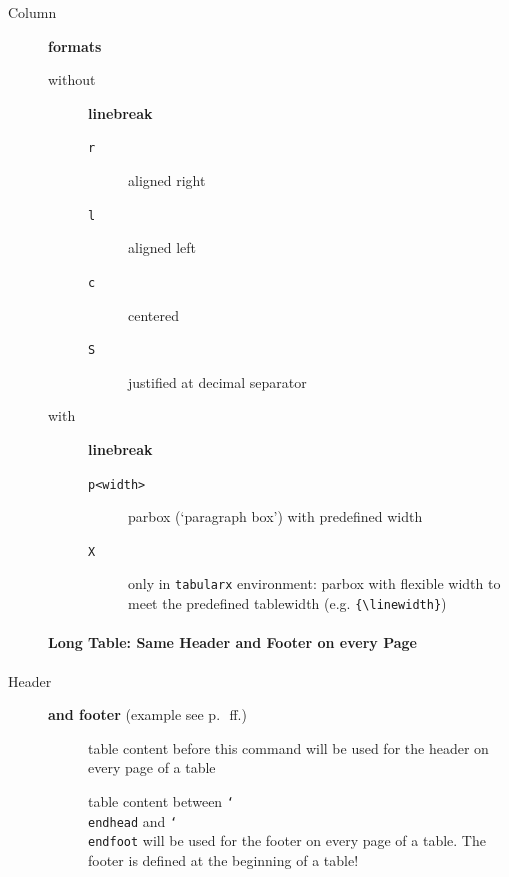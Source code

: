 \documentclass{pharmrep}
\makeatletter
\DeclareRobustCommand\meta[1]{%
   \ensuremath\langle
   \ifmmode \expandafter \nfss@text \fi
   {%
      \meta@font@select
      \edef\meta@hyphen@restore
      {\hyphenchar\the\font\the\hyphenchar\font}%
      \hyphenchar\font\m@ne
      \language\l@nohyphenation
      #1\/%
      \meta@hyphen@restore
   }\ensuremath\rangle
}
\DeclareRobustCommand\cs[1]{\texttt{\char`\\#1}}
\providecommand\oarg[1]{%
   {\ttfamily[}\meta{#1}{\ttfamily]}}
\def\meta@font@select{\itshape}
\makeatother
\begin{document}
\begin{description}
   \item[Column] \textbf{formats}
   \begin{description}
      \item[without] \textbf{linebreak}
      \begin{description}
         \item[\texttt{r}] aligned right
         \item[\texttt{l}] aligned left
         \item[\texttt{c}] centered
         \item[\texttt{S}] justified at decimal separator
      \end{description}
      \item[with] \textbf{linebreak}
      \begin{description}
         \item[\texttt{p{<width>}}] parbox (`paragraph box') with predefined width
         \item[\texttt{X}] only in \texttt{tabularx} environment: parbox with flexible width to meet
         the
         predefined tablewidth (e.g. \verb|{\linewidth}|)
      \end{description}
   \end{description}

   \paragraph{Long Table: Same Header and Footer on every Page}
   \item[Header] \textbf{and footer} (example see p.~\pageref{subsubsec:longtables}\,ff.)
   \begin{description}
      \item[\cs{endhead\oarg{optional argument}}] table content before this command
      will
      be used for the header on every page of a table
      \item[\cs{endfoot\oarg{optional argument}}] table content between
      \cs{endhead} and \cs{endfoot} will be used for the footer on
      every page of a table. The footer is defined at the beginning of a table!
   \end{description}


\end{description}
\end{document}
